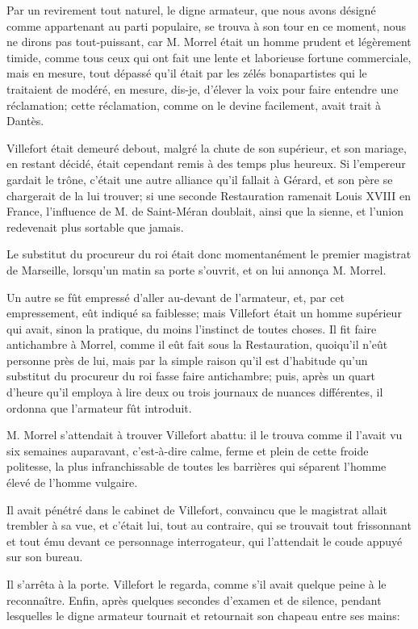 Par un revirement tout naturel, le digne armateur, que nous avons désigné comme appartenant au parti populaire, se trouva à son tour en ce moment, nous ne dirons pas tout-puissant, car M. Morrel était un homme prudent et légèrement timide, comme tous ceux qui ont fait une lente et laborieuse fortune commerciale, mais en mesure, tout dépassé qu'il était par les zélés bonapartistes qui le traitaient de modéré, en mesure, dis-je, d'élever la voix pour faire entendre une réclamation; cette réclamation, comme on le devine facilement, avait trait à Dantès.

Villefort était demeuré debout, malgré la chute de son supérieur, et son mariage, en restant décidé, était cependant remis à des temps plus heureux. Si l'empereur gardait le trône, c'était une autre alliance qu'il fallait à Gérard, et son père se chargerait de la lui trouver; si une seconde Restauration ramenait Louis XVIII en France, l'influence de M. de Saint-Méran doublait, ainsi que la sienne, et l'union redevenait plus sortable que jamais.

Le substitut du procureur du roi était donc momentanément le premier magistrat de Marseille, lorsqu'un matin sa porte s'ouvrit, et on lui annonça M. Morrel.

Un autre se fût empressé d'aller au-devant de l'armateur, et, par cet empressement, eût indiqué sa faiblesse; mais Villefort était un homme supérieur qui avait, sinon la pratique, du moins l'instinct de toutes choses. Il fit faire antichambre à Morrel, comme il eût fait sous la Restauration, quoiqu'il n'eût personne près de lui, mais par la simple raison qu'il est d'habitude qu'un substitut du procureur du roi fasse faire antichambre; puis, après un quart d'heure qu'il employa à lire deux ou trois journaux de nuances différentes, il ordonna que l'armateur fût introduit.

M. Morrel s'attendait à trouver Villefort abattu: il le trouva comme il l'avait vu six semaines auparavant, c'est-à-dire calme, ferme et plein de cette froide politesse, la plus infranchissable de toutes les barrières qui séparent l'homme élevé de l'homme vulgaire.

Il avait pénétré dans le cabinet de Villefort, convaincu que le magistrat allait trembler à sa vue, et c'était lui, tout au contraire, qui se trouvait tout frissonnant et tout ému devant ce personnage interrogateur, qui l'attendait le coude appuyé sur son bureau.

Il s'arrêta à la porte. Villefort le regarda, comme s'il avait quelque peine à le reconnaître. Enfin, après quelques secondes d'examen et de silence, pendant lesquelles le digne armateur tournait et retournait son chapeau entre ses mains:

